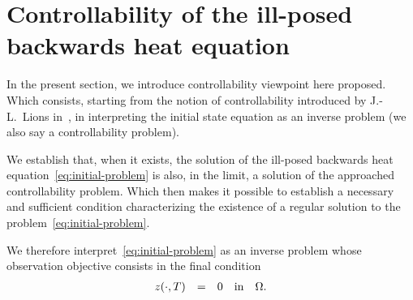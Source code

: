 \section{Controllability of the ill-posed backwards heat
equation}\label{sec:controllability}

In the present section, we introduce controllability viewpoint here
proposed. Which consists, starting from the notion of controllability
introduced by J.-L.~Lions in~\cite[222]{lions1}, in interpreting the
initial state equation as an inverse problem (we also say a controllability
problem).

We establish that, when it exists, the solution of the ill-posed backwards
heat equation~\eqref{eq:initial-problem} is also, in the limit, a solution
of the approached controllability problem. Which then makes it possible to
establish a necessary and sufficient condition characterizing the existence
of a regular solution to the problem~\eqref{eq:initial-problem}.

We therefore interpret~\eqref{eq:initial-problem} as an inverse problem
whose observation objective consists in the final condition
\begin{equation*}
    \begin{array}{rclll}
        {z}\!\left({\cdot,T}\right) & = & 0 & \text{in} & \Omega.
    \end{array}
\end{equation*}

